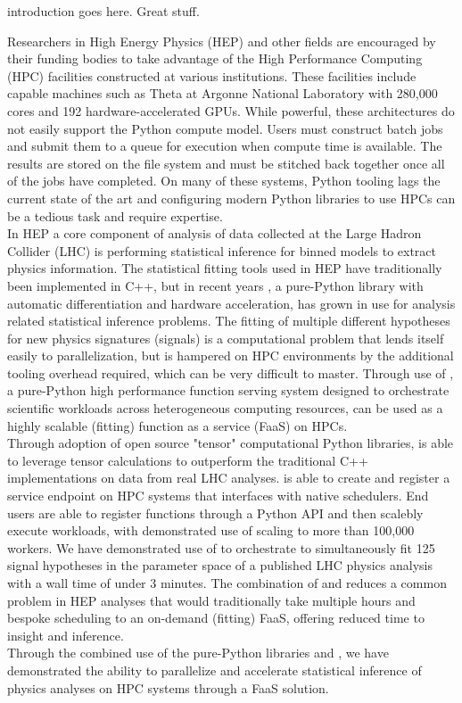 introduction goes here.
Great stuff.~\cite{ATL-PHYS-PUB-2019-029}

Researchers in High Energy Physics (HEP) and other fields are encouraged by their funding bodies to take advantage of the High Performance Computing (HPC) facilities constructed at various institutions.
These facilities include capable machines such as Theta at Argonne National Laboratory with 280,000 cores and 192 hardware-accelerated GPUs.
While powerful, these architectures do not easily support the Python compute model.
Users must construct batch jobs and submit them to a queue for execution when compute time is available.
The results are stored on the file system and must be stitched back together once all of the jobs have completed.
On many of these systems, Python tooling lags the current state of the art and configuring modern Python libraries to use HPCs can be a tedious task and require expertise.\\

In HEP a core component of analysis of data collected at the Large Hadron Collider (LHC) is performing statistical inference for binned models to extract physics information.
The statistical fitting tools used in HEP have traditionally been implemented in C++, but in recent years \pyhf{}, a pure-Python library with automatic differentiation and hardware acceleration, has grown in use for analysis related statistical inference problems.
The fitting of multiple different hypotheses for new physics signatures (signals) is a computational problem that lends itself easily to parallelization, but is hampered on HPC environments by the additional tooling overhead required, which can be very difficult to master.
Through use of \funcX{}, a pure-Python high performance function serving system designed to orchestrate scientific workloads across heterogeneous computing resources, \pyhf{} can be used as a highly scalable (fitting) function as a service (FaaS) on HPCs.\\

Through adoption of open source "tensor" computational Python libraries, \pyhf{} is able to leverage tensor calculations to outperform the traditional C++ implementations on data from real LHC analyses.
\funcX{} is able to create and register a service endpoint on HPC systems that interfaces with native schedulers.
End users are able to register functions through a Python API and then scalebly execute workloads, with demonstrated use of scaling to more than 100,000 workers.
We have demonstrated use of \funcX{} to orchestrate \pyhf{} to simultaneously fit 125 signal hypotheses in the parameter space of a published LHC physics analysis with a wall time of under 3 minutes.
The combination of \pyhf{} and \funcX{} reduces a common problem in HEP analyses that would traditionally take multiple hours and bespoke scheduling to an on-demand (fitting) FaaS, offering reduced time to insight and inference.\\

Through the combined use of the pure-Python libraries \funcX{} and \pyhf{}, we have demonstrated the ability to parallelize and accelerate statistical inference of physics analyses on HPC systems through a FaaS solution.
